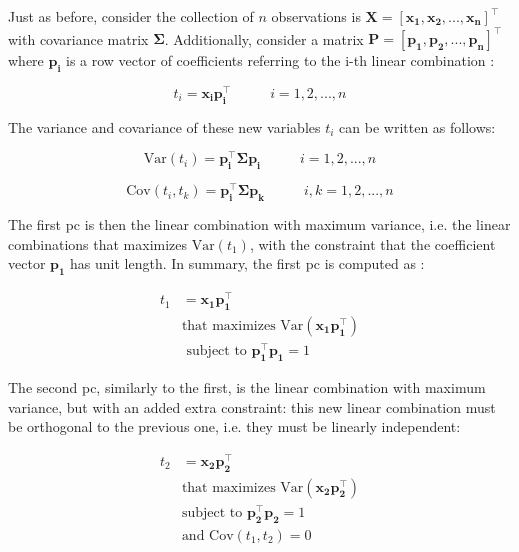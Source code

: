 Just as before, consider the  collection of $n$ observations is $\mathbf{X = [x_1, x_2, ..., x_n]^\intercal}$ with covariance matrix $\mathbf{\Sigma}$. Additionally, consider a matrix $\mathbf{P = [p_1, p_2, ..., p_n]^\intercal}$ where $\mathbf{p_i}$ is a row vector of coefficients referring to the i-th linear combination \parencite{johnson2013applied}:

\begin{equation}
	\label{eqn:pca-lincomb}
	t_i=\mathbf{x_i p_i^\intercal} \;\;\;\;\;\;\;\;\;\; i = 1, 2, ..., n
\end{equation}

The variance and covariance of these new variables $t_i$ can be written as follows:

\begin{equation}
	\label{eqn:pca-var}
	\text{Var}(t_i) = \mathbf{p_i^\intercal \Sigma p_i} \;\;\;\;\;\;\;\;\;\; i = 1, 2, ..., n
\end{equation}

\begin{equation}
	\label{eqn:pca-cov}
	\text{Cov}(t_i, t_k) = \mathbf{p_i^\intercal \Sigma p_k}\;\;\;\;\;\;\;\;\;\; i,k= 1, 2, ..., n
\end{equation}

The first \acrfull{pc} is then the linear combination with maximum variance, i.e. the linear combinations that maximizes $\text{Var}(t_1)$, with the constraint that the coefficient vector $\mathbf{p_1}$ has unit length. In summary, the first \acrshort{pc} is computed as \parencite{johnson2013applied}:

\begin{equation}
	\label{eqn:pca-pc1}
	\begin{split}
		t_1 & =\mathbf{x_1 p_1^\intercal} \\
			   & \text{that maximizes Var}(\mathbf{x_1 p_1^\intercal}) \\
			   & \text{ subject to }  \mathbf{p_1^\intercal p_1} = 1
	\end{split}
\end{equation}

The second \acrshort{pc}, similarly to the first, is the linear combination with maximum variance, but with an added extra constraint: this new linear combination must be orthogonal to the previous one, i.e. they must be linearly independent:

\begin{equation}
	\label{eqn:pca-pc2}
	\begin{split}
		t_2 & =\mathbf{x_2 p_2^\intercal} \\
		& \text{that maximizes Var}(\mathbf{x_2 p_2^\intercal}) \\
		& \text{subject to }  \mathbf{p_2^\intercal p_2} = 1 \\
		& \text{and } \text{Cov}(t_1, t_2) = 0
	\end{split}
\end{equation}

